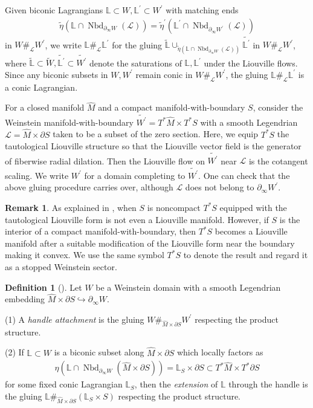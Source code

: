 \documentclass[a4paper,12pt, twoside, pdftex]{amsart}
\theoremstyle{definition}
\newtheorem{definition}[dummy]{Definition}
\newtheorem{remark}[dummy]{Remark}
\numberwithin{equation}{section}
\newcommand{\del}{\partial}
\newcommand{\Nbd}{\operatorname{Nbd}}
\newcommand{\cL}{\mathcal{L}}
\newcommand{\bL}{\mathbb{L}}
\begin{document}
Given biconic Lagrangians
$\bL \subset W, \bL^\prime \subset W^\prime$
with matching ends
\begin{align*}
\widetilde{\eta}(\bL \cap \Nbd_{\del_\infty W}(\cL))
=
\widetilde{\eta}^\prime(\bL^\prime \cap \Nbd_{\del_\infty W^\prime}(\cL))
\end{align*}
in
$W \#_\cL W^\prime$,
we write
$\bL \#_\cL \bL^\prime$
for the gluing
$\widetilde{\bL}
\cup_{\widetilde{\eta}(\bL \cap \Nbd_{\del_\infty W}(\cL))}
\widetilde{\bL^\prime}$
in
$W \#_\cL W^\prime$,
where
$\widetilde{\bL} \subset \widetilde{W},
\widetilde{\bL^\prime} \subset \widetilde{W^\prime}$
denote the saturations of
$\bL, \bL^\prime$
under the Liouville flows.
Since any biconic subsets in
$W, W^\prime$
remain conic in
$W \#_\cL W^\prime$,
the gluing
$\bL \#_\cL \bL^\prime$
is a conic Lagrangian.

For a closed manifold
$\widehat{M}$
and
a compact manifold-with-boundary
$S$,
consider the Weinstein manifold-with-boundary
$\widetilde{W^\prime} = T^* \widehat{M} \times T^* S$
with a smooth Legendrian
$\cL = \widehat{M} \times \del S$
taken to be a subset of the zero section.
Here,
we equip
$T^* S$
the tautological Liouville structure
so that 
the Liouville vector field is the generator of fiberwise radial dilation.
Then the Liouville flow on
$\widetilde{W^\prime}$
near
$\cL$
is the cotangent scaling.
We write
$W^\prime$
for a domain completing to
$\widetilde{W^\prime}$.
One can check that
the above gluing procedure carries over,
although
$\cL$
does not belong to
$\del_\infty W^\prime$.

\begin{remark} \label{rmk:2.3}
As explained in
\cite[Example 2.3]{GPS1},
when
$S$
is noncompact
$T^* S$
equipped with the tautological Liouville form is not even a Liouville manifold.
However,
if
$S$
is the interior of a compact manifold-with-boundary,
then
$T^* S$
becomes a Liouville manifold after a suitable modification of the Liouville form near the boundary making it convex.
We
use the same symbol
$T^* S$
to denote the result
and
regard it as a stopped Weinstein sector.
\end{remark}

\begin{definition}[{\cite[Definition 4.11]{GS1}}] \label{dfn:extension}
Let
$W$
be a Weinstein domain with a smooth Legendrian embedding
$\widehat{M} \times \del S \hookrightarrow \del_\infty W$.

(1)
A
\emph{handle attachment}
is the gluing
$W \#_{\widehat{M} \times \del S} W^\prime$
respecting the product structure.

(2)
If
$\bL \subset W$
is a biconic subset along
$\widehat{M} \times \del S$
which locally factors as
\begin{align*}
\eta(\bL \cap \Nbd_{\del_\infty W}(\widehat{M} \times \del S))
=
\bL_S \times \del S
\subset
T^*\widehat{M} \times T^* \del S
\end{align*}
for some fixed conic Lagrangian
$\bL_S$,
then the
\emph{extension}
of
$\bL$
through the handle is the gluing
$\bL \#_{\widehat{M} \times \del S} (\bL_S \times S)$
respecting the product structure.
\end{definition}
\end{document}
